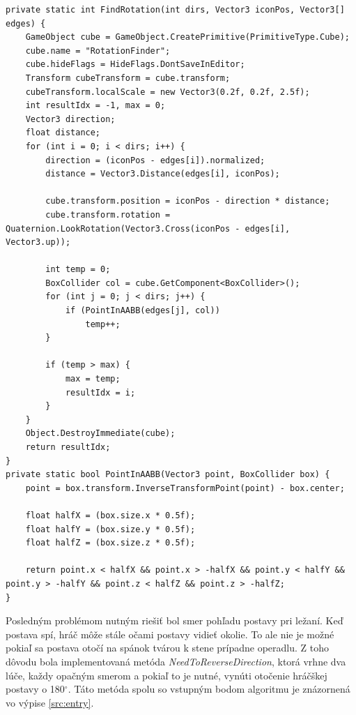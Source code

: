 \documentclass[slovak, bachelorpractice]{diploma}
\begin{document}
\vspace{10pt}
\begin{lstlisting}[label=src:findRot,caption={Získanie korektnej rotácie hráčskej postavy pri ležaní}]
private static int FindRotation(int dirs, Vector3 iconPos, Vector3[] edges) {
    GameObject cube = GameObject.CreatePrimitive(PrimitiveType.Cube);
    cube.name = "RotationFinder";
    cube.hideFlags = HideFlags.DontSaveInEditor;
    Transform cubeTransform = cube.transform;
    cubeTransform.localScale = new Vector3(0.2f, 0.2f, 2.5f);
    int resultIdx = -1, max = 0;
    Vector3 direction;
    float distance;
    for (int i = 0; i < dirs; i++) {
        direction = (iconPos - edges[i]).normalized;
        distance = Vector3.Distance(edges[i], iconPos);

        cube.transform.position = iconPos - direction * distance;
        cube.transform.rotation = Quaternion.LookRotation(Vector3.Cross(iconPos - edges[i], Vector3.up));

        int temp = 0;
        BoxCollider col = cube.GetComponent<BoxCollider>();
        for (int j = 0; j < dirs; j++) {
            if (PointInAABB(edges[j], col))
                temp++;
        }

        if (temp > max) {
            max = temp;
            resultIdx = i;
        }
    }
    Object.DestroyImmediate(cube);
    return resultIdx;
}
private static bool PointInAABB(Vector3 point, BoxCollider box) {
    point = box.transform.InverseTransformPoint(point) - box.center;

    float halfX = (box.size.x * 0.5f);
    float halfY = (box.size.y * 0.5f);
    float halfZ = (box.size.z * 0.5f);

    return point.x < halfX && point.x > -halfX && point.y < halfY && point.y > -halfY && point.z < halfZ && point.z > -halfZ;
}
\end{lstlisting}

Posledným problémom nutným riešiť bol smer pohľadu postavy pri ležaní. Keď postava spí, hráč môže stále očami postavy vidieť okolie. To ale nie je možné pokiaľ sa postava otočí na spánok tvárou k stene prípadne operadlu. Z toho dôvodu bola implementovaná metóda \textit{NeedToReverseDirection}, ktorá vrhne dva lúče, každy opačným smerom a pokiaľ to je nutné, vynúti otočenie hráčškej postavy o 180$^{\circ}$. Táto metóda spolu so vstupným bodom algoritmu je znázornená vo výpise \ref{src:entry}.
\end{document}
